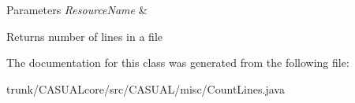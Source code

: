 \begin{DoxyParams}{Parameters}
{\em Resource\-Name} & \\
\hline
\end{DoxyParams}
\begin{DoxyReturn}{Returns}
number of lines in a file 
\end{DoxyReturn}


The documentation for this class was generated from the following file\-:\begin{DoxyCompactItemize}
\item 
trunk/\-C\-A\-S\-U\-A\-Lcore/src/\-C\-A\-S\-U\-A\-L/misc/Count\-Lines.\-java\end{DoxyCompactItemize}
